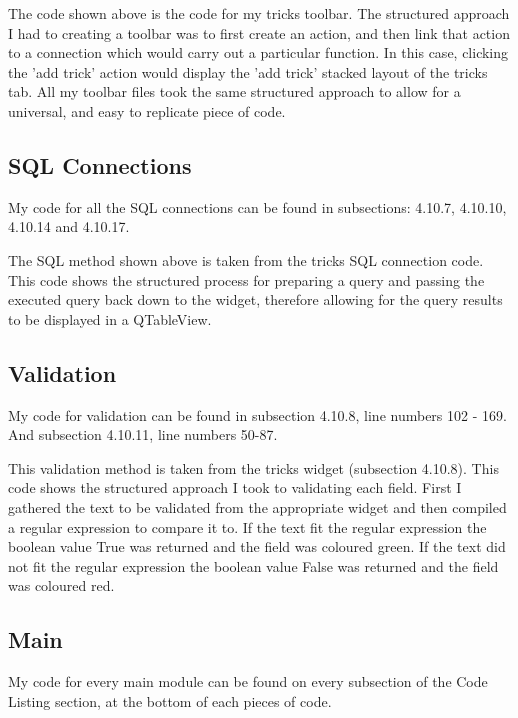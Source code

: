 The code shown above is the code for my tricks toolbar. The structured approach I had to creating a toolbar was to first create an action, and then link that action to a connection which would carry out a particular function. In this case, clicking the 'add trick' action would display the 'add trick' stacked layout of the tricks tab. All my toolbar files took the same structured approach to allow for a universal, and easy to replicate piece of code.

\subsection{SQL Connections}

My code for all the SQL connections can be found in subsections: 4.10.7, 4.10.10, 4.10.14 and 4.10.17.


The SQL method shown above is taken from the tricks SQL connection code. This code shows the structured process for preparing a query and passing the executed query back down to the widget, therefore allowing for the query results to be displayed in a QTableView.

\subsection{Validation}

My code for validation can be found in subsection 4.10.8, line numbers 102 - 169. And subsection 4.10.11, line numbers 50-87.


This validation method is taken from the tricks widget (subsection 4.10.8). This code shows the structured approach I took to validating each field. First I gathered the text to be validated from the appropriate widget and then compiled a regular expression to compare it to. If the text fit the regular expression the boolean value True was returned and the field was coloured green. If the text did not fit the regular expression the boolean value False was returned and the field was coloured red.


\subsection{Main}

My code for every main module can be found on every subsection of the Code Listing section, at the bottom of each pieces of code.

